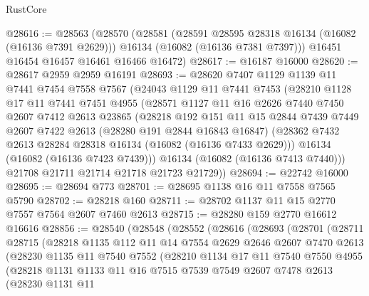 \begin{lexlean}{RustCore}
\begin{coremodule}
@28616 := @28563
    (@28570
      (@28581
        (@28591 @28595 @28318 @16134 (@16082 (@16136 @7391 @2629)))
        @16134
        (@16082 (@16136 @7381 @7397)))
      @16451
      @16454
      @16457
      @16461
      @16466
      @16472)
@28617 := @16187 @16000
@28620 := @28617 @2959 @2959 @16191
@28693 := @28620
    @7407
    @1129
    @1139
    @11
    @7441
    @7454
    @7558
    @7567
    (@24043
      @1129
      @11
      @7441
      @7453
      (@28210
        @1128
        @17
        @11
        @7441
        @7451
        @4955
        (@28571
          @1127
          @11
          @16
          @2626
          @7440
          @7450
          @2607
          @7412
          @2613
          @23865
          (@28218
            @192
            @151
            @11
            @15
            @2844
            @7439
            @7449
            @2607
            @7422
            @2613
            (@28280 @191 @2844 @16843 @16847)
            (@28362 @7432 @2613 @28284 @28318 @16134 (@16082 (@16136 @7433 @2629)))
            @16134
            (@16082 (@16136 @7423 @7439)))
          @16134
          (@16082 (@16136 @7413 @7440)))
        @21708
        @21711
        @21714
        @21718
        @21723
        @21729))
@28694 := @22742 @16000
@28695 := @28694 @773
@28701 := @28695 @1138 @16 @11 @7558 @7565 @5790
@28702 := @28218 @160
@28711 := @28702 @1137 @11 @15 @2770 @7557 @7564 @2607 @7460 @2613
@28715 := @28280 @159 @2770 @16612 @16616
@28856 := @28540
    (@28548
      (@28552
        (@28616
          (@28693
            (@28701
              (@28711
                @28715
                (@28218
                  @1135
                  @112
                  @11
                  @14
                  @7554
                  @2629
                  @2646
                  @2607
                  @7470
                  @2613
                  (@28230
                    @1135
                    @11
                    @7540
                    @7552
                    (@28210
                      @1134
                      @17
                      @11
                      @7540
                      @7550
                      @4955
                      (@28218
                        @1131
                        @1133
                        @11
                        @16
                        @7515
                        @7539
                        @7549
                        @2607
                        @7478
                        @2613
                        (@28230
                          @1131
                          @11

\end{coremodule}
\end{lexlean}
